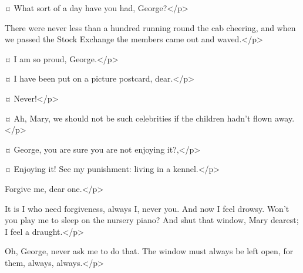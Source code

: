 \begin{drama}
\mrsdarlingspeaks {}¤
What sort of a day have you had, George?</p>


\mrdarlingspeaks
There were never less than a hundred running round the cab cheering,
and when we passed the Stock Exchange the members came out and waved.</p>


\mrsdarlingspeaks {}¤
I am so proud, George.</p>

\mrdarlingspeaks {}¤
I have been put on a picture postcard, dear.</p>

\mrsdarlingspeaks {}¤
Never!</p>

\mrdarlingspeaks {}¤
Ah, Mary, we should not be such celebrities if the children hadn't flown away.</p>

\mrsdarlingspeaks {}¤
George, you are sure you are not enjoying it?,</p>

\mrdarlingspeaks {}¤
Enjoying it!
See my punishment: living in a kennel.</p>

\mrsdarlingspeaks
Forgive me, dear one.</p>

\mrdarlingspeaks
It is I who need forgiveness, always I, never you.
And now I feel drowsy.
Won't you play me to sleep on the nursery piano?
And shut that window, Mary dearest; I feel a draught.</p>

\mrsdarlingspeaks
Oh, George, never ask me to do that.
The window must always be left open, for them, always, always.</p>



\end{drama}
